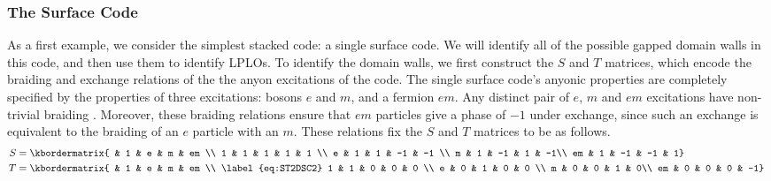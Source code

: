 \documentclass[pra,twocolumn,a4paper,nofootinbib]{revtex4-1}
\begin{document}
\subsubsection{The Surface Code}
As a first example, we consider the simplest stacked code: a single surface code.  We will identify all of the possible gapped domain walls in this code, and then use them to identify LPLOs.  To identify the domain walls, we first construct the $S$ and $T$ matrices, which encode the braiding and exchange relations of the the anyon excitations of the code.  The single surface code's anyonic properties are completely specified by the properties of three excitations:  bosons $e$ and $m$, and a fermion $em$.  Any distinct pair of $e$, $m$ and $em$ excitations have non-trivial braiding \cite{Kitaev}. Moreover, these braiding relations ensure that $em$ particles give a phase of $-1$ under exchange, since such an exchange is equivalent to the braiding of an $e$ particle with an $m$. These relations fix the $S$ and $T$ matrices to be as follows.
\begin{align} \label{eq:ST2DSC}
S &=   \kbordermatrix{  & 1 & e & m & em \\  1 & 1 & 1 & 1 & 1 \\
      e & 1 & 1 & -1 & -1 \\
      m & 1 & -1 & 1 & -1\\
     em & 1 & -1 & -1 & 1} \,\\
     T 
     &=\kbordermatrix{ & 1 & e & m & em \\
     \label{eq:ST2DSC2}
      1 & 1 & 0 & 0 & 0 \\
      e & 0 & 1 & 0 & 0 \\
      m & 0 & 0 & 1 & 0\\
     em & 0 & 0 & 0 & -1}\,
\end{align}
\end{document}
